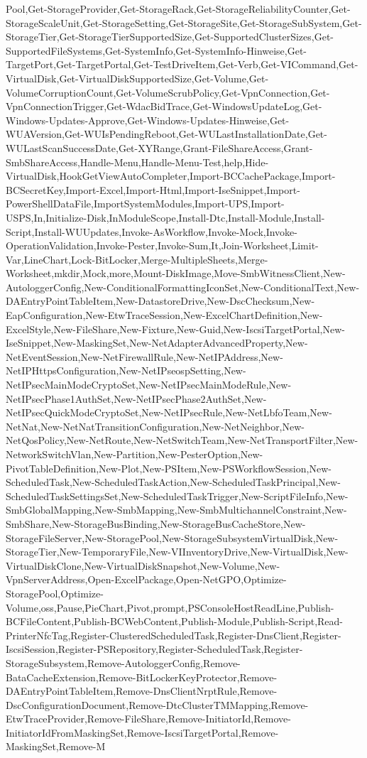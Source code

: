 {{Pool,Get-StorageProvider,Get-StorageRack,Get-StorageReliabilityCounter,Get-StorageScaleUnit,Get-StorageSetting,Get-StorageSite,Get-StorageSubSystem,Get-StorageTier,Get-StorageTierSupportedSize,Get-SupportedClusterSizes,Get-SupportedFileSystems,Get-SystemInfo,Get-SystemInfo-Hinweise,Get-TargetPort,Get-TargetPortal,Get-TestDriveItem,Get-Verb,Get-VICommand,Get-VirtualDisk,Get-VirtualDiskSupportedSize,Get-Volume,Get-VolumeCorruptionCount,Get-VolumeScrubPolicy,Get-VpnConnection,Get-VpnConnectionTrigger,Get-WdacBidTrace,Get-WindowsUpdateLog,Get-Windows-Updates-Approve,Get-Windows-Updates-Hinweise,Get-WUAVersion,Get-WUIsPendingReboot,Get-WULastInstallationDate,Get-WULastScanSuccessDate,Get-XYRange,Grant-FileShareAccess,Grant-SmbShareAccess,Handle-Menu,Handle-Menu-Test,help,Hide-VirtualDisk,HookGetViewAutoCompleter,Import-BCCachePackage,Import-BCSecretKey,Import-Excel,Import-Html,Import-IseSnippet,Import-PowerShellDataFile,ImportSystemModules,Import-UPS,Import-USPS,In,Initialize-Disk,InModuleScope,Install-Dtc,Install-Module,Install-Script,Install-WUUpdates,Invoke-AsWorkflow,Invoke-Mock,Invoke-OperationValidation,Invoke-Pester,Invoke-Sum,It,Join-Worksheet,Limit-Var,LineChart,Lock-BitLocker,Merge-MultipleSheets,Merge-Worksheet,mkdir,Mock,more,Mount-DiskImage,Move-SmbWitnessClient,New-AutologgerConfig,New-ConditionalFormattingIconSet,New-ConditionalText,New-DAEntryPointTableItem,New-DatastoreDrive,New-DscChecksum,New-EapConfiguration,New-EtwTraceSession,New-ExcelChartDefinition,New-ExcelStyle,New-FileShare,New-Fixture,New-Guid,New-IscsiTargetPortal,New-IseSnippet,New-MaskingSet,New-NetAdapterAdvancedProperty,New-NetEventSession,New-NetFirewallRule,New-NetIPAddress,New-NetIPHttpsConfiguration,New-NetIPseospSetting,New-NetIPsecMainModeCryptoSet,New-NetIPsecMainModeRule,New-NetIPsecPhase1AuthSet,New-NetIPsecPhase2AuthSet,New-NetIPsecQuickModeCryptoSet,New-NetIPsecRule,New-NetLbfoTeam,New-NetNat,New-NetNatTransitionConfiguration,New-NetNeighbor,New-NetQosPolicy,New-NetRoute,New-NetSwitchTeam,New-NetTransportFilter,New-NetworkSwitchVlan,New-Partition,New-PesterOption,New-PivotTableDefinition,New-Plot,New-PSItem,New-PSWorkflowSession,New-ScheduledTask,New-ScheduledTaskAction,New-ScheduledTaskPrincipal,New-ScheduledTaskSettingsSet,New-ScheduledTaskTrigger,New-ScriptFileInfo,New-SmbGlobalMapping,New-SmbMapping,New-SmbMultichannelConstraint,New-SmbShare,New-StorageBusBinding,New-StorageBusCacheStore,New-StorageFileServer,New-StoragePool,New-StorageSubsystemVirtualDisk,New-StorageTier,New-TemporaryFile,New-VIInventoryDrive,New-VirtualDisk,New-VirtualDiskClone,New-VirtualDiskSnapshot,New-Volume,New-VpnServerAddress,Open-ExcelPackage,Open-NetGPO,Optimize-StoragePool,Optimize-Volume,oss,Pause,PieChart,Pivot,prompt,PSConsoleHostReadLine,Publish-BCFileContent,Publish-BCWebContent,Publish-Module,Publish-Script,Read-PrinterNfcTag,Register-ClusteredScheduledTask,Register-DnsClient,Register-IscsiSession,Register-PSRepository,Register-ScheduledTask,Register-StorageSubsystem,Remove-AutologgerConfig,Remove-BataCacheExtension,Remove-BitLockerKeyProtector,Remove-DAEntryPointTableItem,Remove-DnsClientNrptRule,Remove-DscConfigurationDocument,Remove-DtcClusterTMMapping,Remove-EtwTraceProvider,Remove-FileShare,Remove-InitiatorId,Remove-InitiatorIdFromMaskingSet,Remove-IscsiTargetPortal,Remove-MaskingSet,Remove-M}}
